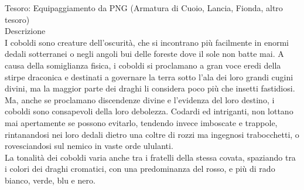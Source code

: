\begin{multicols}{2}
Tesoro: Equipaggiamento da PNG (Armatura di Cuoio, Lancia, Fionda, altro tesoro)\\
Descrizione\\
I coboldi sono creature dell'oscurità, che si incontrano più facilmente in enormi dedali sotterranei o negli angoli bui delle foreste dove il sole non batte mai. A causa della somiglianza fisica, i coboldi si proclamano a gran voce eredi della stirpe draconica e destinati a governare la terra sotto l'ala dei loro grandi cugini divini, ma la maggior parte dei draghi li considera poco più che insetti fastidiosi. Ma, anche se proclamano discendenze divine e l'evidenza del loro destino, i coboldi sono consapevoli della loro debolezza. Codardi ed intriganti, non lottano mai apertamente se possono evitarlo, tendendo invece imboscate e trappole, rintanandosi nei loro dedali dietro una coltre di rozzi ma ingegnosi trabocchetti, o rovesciandosi sul nemico in vaste orde ululanti.\\
La tonalità dei coboldi varia anche tra i fratelli della stessa covata, spaziando tra i colori dei draghi cromatici, con una predominanza del rosso, e più di rado bianco, verde, blu e nero.\\


\end{multicols}
